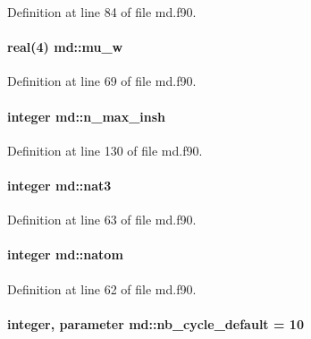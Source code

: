 Definition at line 84 of file md.\-f90.

\hypertarget{classmd_a89b589054b90dada6fb26342927dbeae}{
\paragraph[{mu\-\_\-w}]{\setlength{\rightskip}{0pt plus 5cm}real(4) md\-::mu\-\_\-w}}\label{classmd_a89b589054b90dada6fb26342927dbeae}


Definition at line 69 of file md.\-f90.

\hypertarget{classmd_a14a145b4c00d0726456c5e8bd9934b64}{
\paragraph[{n\-\_\-max\-\_\-insh}]{\setlength{\rightskip}{0pt plus 5cm}integer md\-::n\-\_\-max\-\_\-insh}}\label{classmd_a14a145b4c00d0726456c5e8bd9934b64}


Definition at line 130 of file md.\-f90.

\hypertarget{classmd_a722363b10ec879b742c6798339f2cf8f}{
\paragraph[{nat3}]{\setlength{\rightskip}{0pt plus 5cm}integer md\-::nat3}}\label{classmd_a722363b10ec879b742c6798339f2cf8f}


Definition at line 63 of file md.\-f90.

\hypertarget{classmd_a21f10b21c3a176c7844e777597140eaa}{
\paragraph[{natom}]{\setlength{\rightskip}{0pt plus 5cm}integer md\-::natom}}\label{classmd_a21f10b21c3a176c7844e777597140eaa}


Definition at line 62 of file md.\-f90.

\hypertarget{classmd_a3a5bbab59418bb873317f301c5948a40}{
\paragraph[{nb\-\_\-cycle\-\_\-default}]{\setlength{\rightskip}{0pt plus 5cm}integer, parameter md\-::nb\-\_\-cycle\-\_\-default = 10}}\label{classmd_a3a5bbab59418bb873317f301c5948a40}


